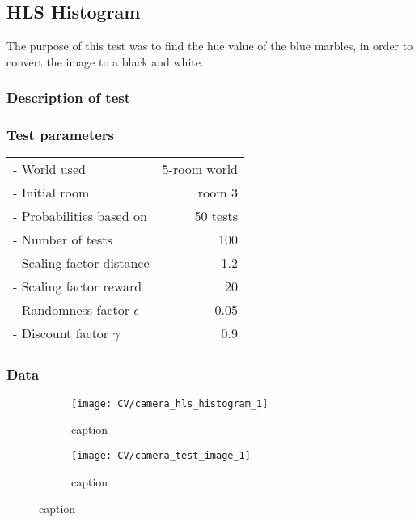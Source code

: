 \documentclass[../Head/Main.tex]{subfiles}
\begin{document}
\subsection{HLS Histogram}
\label{subsec:test_HLS_hist}
The purpose of this test was to find the hue value of the blue marbles, in order to convert the image to a black and white. 

\subsubsection{Description of test}



\subsubsection{Test parameters}
\begin{minipage}[c]{0.35\textwidth}
	\begin{tabular}{l r}
	- World used                   & 5-room world\\
	- Initial room                 & room 3\\	
	- Probabilities based on       & 50 tests\\	
	- Number of tests              & 100\\
	- Scaling factor distance      & 1.2\\
	- Scaling factor reward        & 20\\
	- Randomness factor $\epsilon$ & 0.05\\
	- Discount factor $\gamma$     & 0.9\\
	\end{tabular}
\end{minipage}	

\subsubsection{Data}


\begin{figure}[H]
	\centering
	\begin{subfigure}[b]{0.48\textwidth}
		\centering
		\texttt{[image: CV/camera\_hls\_histogram\_1]}
		\caption{caption}
	\end{subfigure}
	\hfill
	\begin{subfigure}[b]{0.5\textwidth}
		\centering
		\texttt{[image: CV/camera\_test\_image\_1]}
		\caption{caption}
	\end{subfigure}
	\caption{caption}
\end{figure}
\end{document}
